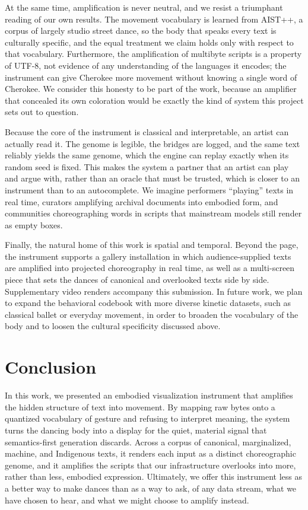 \documentclass{vgtc}                          %
\begin{document}
At the same time, amplification is never neutral, and we resist a triumphant
reading of our own results. The movement vocabulary is learned from AIST++, a
corpus of largely studio street dance, so the body that speaks every text is
culturally specific, and the equal treatment we claim holds only with respect to
that vocabulary. Furthermore, the amplification of multibyte scripts is a property
of UTF-8, not evidence of any understanding of the languages it encodes; the
instrument can give Cherokee more movement without knowing a single word of
Cherokee. We consider this honesty to be part of the work, because an amplifier
that concealed its own coloration would be exactly the kind of system this project
sets out to question.

Because the core of the instrument is classical and interpretable, an artist can
actually read it. The genome is legible, the bridges are logged, and the same text
reliably yields the same genome, which the engine can replay exactly when its
random seed is fixed. This makes the system a partner that an artist can
play and argue with, rather than an oracle that must be trusted, which is closer to
an instrument than to an autocomplete. We imagine performers ``playing'' texts in
real time, curators amplifying archival documents into embodied form, and
communities choreographing words in scripts that mainstream models still render as
empty boxes.

Finally, the natural home of this work is spatial and temporal. Beyond the page,
the instrument supports a gallery installation in which audience-supplied texts are
amplified into projected choreography in real time, as well as a multi-screen piece
that sets the dances of canonical and overlooked texts side by side. Supplementary
video renders accompany this submission. In future work, we plan to expand the
behavioral codebook with more diverse kinetic datasets, such as classical ballet or
everyday movement, in order to broaden the vocabulary of the body and to loosen the
cultural specificity discussed above.

\section{Conclusion}
In this work, we presented an embodied visualization instrument that amplifies the
hidden structure of text into movement. By mapping raw bytes onto a quantized
vocabulary of gesture and refusing to interpret meaning, the system turns the
dancing body into a display for the quiet, material signal that semantics-first
generation discards. Across a corpus of canonical, marginalized, machine, and
Indigenous texts, it renders each input as a distinct choreographic genome, and it
amplifies the scripts that our infrastructure overlooks into more, rather than
less, embodied expression. Ultimately, we offer this instrument less as a better
way to make dances than as a way to ask, of any data stream, what we have chosen
to hear, and what we might choose to amplify instead.
\end{document}
